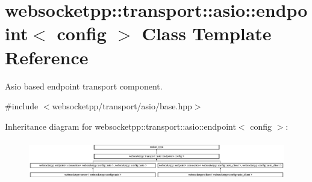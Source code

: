 \hypertarget{classwebsocketpp_1_1transport_1_1asio_1_1endpoint}{}\section{websocketpp\+:\+:transport\+:\+:asio\+:\+:endpoint$<$ config $>$ Class Template Reference}
\label{classwebsocketpp_1_1transport_1_1asio_1_1endpoint}


Asio based endpoint transport component.  




{\ttfamily \#include $<$websocketpp/transport/asio/base.\+hpp$>$}

Inheritance diagram for websocketpp\+:\+:transport\+:\+:asio\+:\+:endpoint$<$ config $>$\+:\begin{figure}[H]
\begin{center}
\leavevmode
\includegraphics[height=1.789137cm]{classwebsocketpp_1_1transport_1_1asio_1_1endpoint}
\end{center}
\end{figure}
